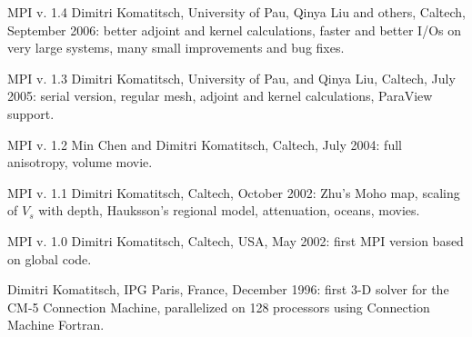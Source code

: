 MPI v. 1.4 Dimitri Komatitsch, University of Pau, Qinya Liu and others,
Caltech, September 2006: better adjoint and kernel calculations, faster
and better I/Os on very large systems, many small improvements and
bug fixes.\newline


MPI v. 1.3 Dimitri Komatitsch, University of Pau, and Qinya Liu, Caltech,
July 2005: serial version, regular mesh, adjoint and kernel calculations,
ParaView support.\newline


MPI v. 1.2 Min Chen and Dimitri Komatitsch, Caltech, July 2004: full
anisotropy, volume movie.\newline


MPI v. 1.1 Dimitri Komatitsch, Caltech, October 2002: Zhu's Moho map,
scaling of $V_{s}$ with depth, Hauksson's regional model, attenuation,
oceans, movies.\newline


MPI v. 1.0 Dimitri Komatitsch, Caltech, USA, May 2002: first MPI version
based on global code.\newline


Dimitri Komatitsch, IPG Paris, France, December 1996: first 3-D solver
for the CM-5 Connection Machine, parallelized on 128 processors using
Connection Machine Fortran.\newline

